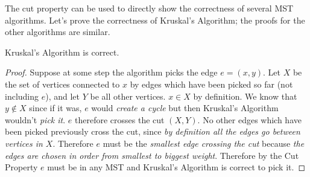 The cut property can be used to directly show the correctness of
several MST algorithms.  Let's prove the correctness of Kruskal's
Algorithm; the proofs for the other algorithms are similar.

\begin{thm}
  Kruskal's Algorithm is correct.
\end{thm}

\begin{proof}
  Suppose at some step the algorithm picks the edge $e = (x,y)$.  Let
  $X$ be the set of vertices connected to $x$ by edges which have been
  picked so far (not including $e$), and let $Y$ be all other
  vertices. $x \in X$ by definition.  We know that $y \notin X$ since
  if it was, $e$ would \emph{create a cycle} but then Kruskal's
  Algorithm wouldn't \emph{pick it}. $e$ therefore crosses the cut
  $(X,Y)$. No other edges which have been picked previously cross the
  cut, since \emph{by definition all the edges go between vertices in
    $X$}. Therefore $e$ must be the \emph{smallest edge crossing the
    cut} because \emph{the edges are chosen in order from smallest to
    biggest weight}. Therefore by the Cut Property $e$ must be in any
  MST and Kruskal's Algorithm is correct to pick it.
\end{proof}

